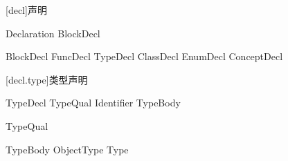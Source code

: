 
[decl]{声明}

\begin{bnf}{Declaration}
    BlockDecl
\end{bnf}

\begin{bnf}{BlockDecl}
    FuncDecl \br
    TypeDecl \br
    ClassDecl \br
    EnumDecl \br
    ConceptDecl
\end{bnf}

[decl.type]{类型声明}

\begin{bnf}{TypeDecl}
    TypeQual\bnfs {} Identifier TypeBody
\end{bnf}

\begin{bnf}{TypeQual}
\end{bnf}

\begin{bnf}{TypeBody}
    ObjectType \br
    \terminal{=} Type
\end{bnf}